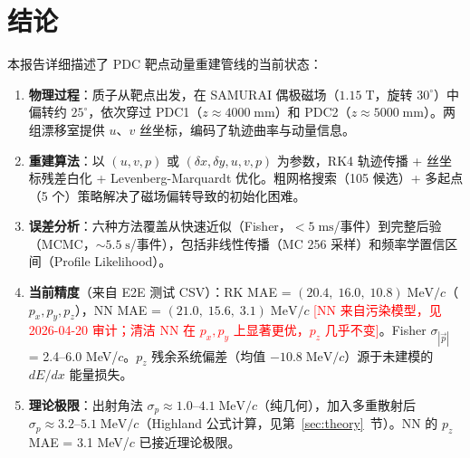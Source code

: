\documentclass[a4paper, 11pt]{article}
\begin{document}
\section{结论}

本报告详细描述了 PDC 靶点动量重建管线的当前状态：

\begin{enumerate}
  \item \textbf{物理过程}：质子从靶点出发，在 SAMURAI 偶极磁场（$1.15\;\mathrm{T}$，旋转 $30^\circ$）中偏转约 $25^\circ$，依次穿过 PDC1（$z \approx 4000\;\mathrm{mm}$）和 PDC2（$z \approx 5000\;\mathrm{mm}$）。两组漂移室提供 $u$、$v$ 丝坐标，编码了轨迹曲率与动量信息。

  \item \textbf{重建算法}：以 $(u, v, p)$ 或 $(\delta x, \delta y, u, v, p)$ 为参数，RK4 轨迹传播 + 丝坐标残差白化 + Levenberg-Marquardt 优化。粗网格搜索（105 候选）+ 多起点（5 个）策略解决了磁场偏转导致的初始化困难。

  \item \textbf{误差分析}：六种方法覆盖从快速近似（Fisher，$< 5\;\mathrm{ms}$/事件）到完整后验（MCMC，$\sim 5.5\;\mathrm{s}$/事件），包括非线性传播（MC 256 采样）和频率学置信区间（Profile Likelihood）。

  \item \textbf{当前精度}（来自 E2E 测试 CSV）：RK MAE = $(20.4,\;16.0,\;10.8)\;\mathrm{MeV}/c$（$p_x, p_y, p_z$），NN MAE = $(21.0,\;15.6,\;3.1)\;\mathrm{MeV}/c$ \textcolor{red}{[NN 来自污染模型，见 2026-04-20 审计；清洁 NN 在 $p_x,p_y$ 上显著更优，$p_z$ 几乎不变]}。Fisher $\sigma_{|\vec{p}|}$ = 2.4--6.0 MeV/$c$。$p_z$ 残余系统偏差（均值 $-10.8\;\mathrm{MeV}/c$）源于未建模的 $dE/dx$ 能量损失。

  \item \textbf{理论极限}：出射角法 $\sigma_p \approx 1.0\text{--}4.1\;\mathrm{MeV}/c$（纯几何），加入多重散射后 $\sigma_p \approx 3.2\text{--}5.1\;\mathrm{MeV}/c$（Highland 公式计算，见第~\ref{sec:theory}~节）。NN 的 $p_z$ MAE = 3.1 MeV/$c$ 已接近理论极限。
\end{enumerate}
\end{document}
